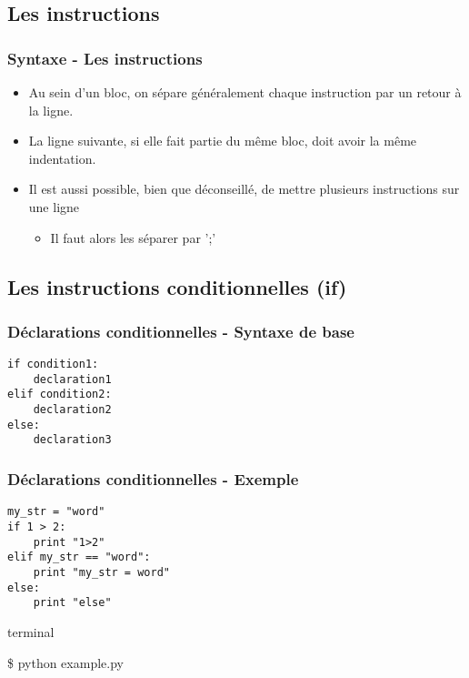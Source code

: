\subsection{Les instructions}
\begin{frame}
  \frametitle{Syntaxe - Les instructions}
  \begin{itemize}
    \item<1-> Au sein d'un bloc, on sépare généralement chaque instruction par un retour à la ligne.
    \item<2-> La ligne suivante, si elle fait partie du même bloc, doit avoir la même indentation.
    \item<3-> Il est aussi possible, bien que déconseillé, de mettre plusieurs instructions sur une ligne
    \begin{itemize}
      \item<4-> Il faut alors les séparer par ';'
    \end{itemize}
  \end{itemize}
\end{frame}

\subsection{Les instructions conditionnelles (if)}
\begin{frame}[fragile]
  \frametitle{Déclarations conditionnelles - Syntaxe de base}
  \begin{lstlisting}
if condition1:
    declaration1
elif condition2:
    declaration2
else:
    declaration3
  \end{lstlisting}
\end{frame}

\begin{frame}[fragile]
  \frametitle{Déclarations conditionnelles - Exemple}
  \begin{lstlisting}
my_str = "word"
if 1 > 2:
    print "1>2"
elif my_str == "word":
    print "my_str = word"
else:
    print "else"
  \end{lstlisting}

  \begin{beamercolorbox}{terminal}
  \begin{semiverbatim}
 \$ python example.py
  \end{semiverbatim}
  \end{beamercolorbox}

\end{frame}

